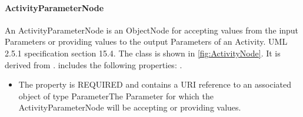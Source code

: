\paragraph{ActivityParameterNode}%
\label{sec:uml:ActivityParameterNode}%
An ActivityParameterNode is an ObjectNode for accepting values from the input Parameters or providing values to the output Parameters of an Activity. UML 2.5.1 specification section 15.4.%
\linebreak%
\linebreak%
The  class is shown in \ref{fig:ActivityNode}. It is derived from .%
 includes the following properties: . %
\begin{itemize}%
\item%
The  property is REQUIRED and contains a URI reference to an associated object of type ParameterThe Parameter for which the ActivityParameterNode will be accepting or providing values.%
\end{itemize}%
